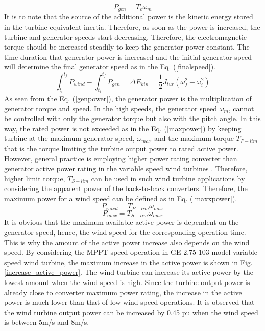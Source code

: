\begin{equation}
P_{gen}=T_{e} \omega_{m}
\label{genpower}
\end{equation}
It is to note that the source of the additional power is the kinetic energy stored in the turbine equivalent inertia. Therefore, as soon as the power is increased, the turbine and generator speeds start decreasing. Therefore, the electromagnetic torque should be increased steadily to keep the generator power constant. The time duration that generator power is increased and the initial generator speed will determine the final generator speed as in the Eq. (\ref{finalspeed}).
\begin{equation}
 \int_{t_{i}}^{t_{f}}P_{wind}- \int_{t_{i}}^{t_{f}}P_{gen}=\Delta E_{kin}=\frac{1}{2}J_{tur}(\omega_{f}^2-\omega_{i}^2)
\label{finalspeed}
\end{equation}
As seen from the Eq. (\ref{genpower}), the generator power is the multiplication of generator torque and speed. In the high speeds, the generator speed $\omega_{m}$, cannot be controlled with only the generator torque but also with the pitch angle. In this way, the rated power is not exceeded as in the Eq. (\ref{maxpower}) by keeping turbine at the maximum generator speed, $\omega_{max}$ and the maximum torque $T_{P-lim}$ that is the torque limiting the turbine output power to rated active power. However, general practice is employing higher power rating converter than generator active power rating in the variable speed wind turbines \cite{Muljadi2012}.  Therefore, higher limit torque, $T_{S-lim}$ can be used in such wind turbine applications by considering the apparent power of the back-to-back converters. Therefore, the maximum power for a wind speed can be defined as in Eq. (\ref{maxxpower}).
\begin{equation}
P_{rated}=T_{P-lim} \omega_{max}
\label{maxpower}
\end{equation}
\begin{equation}
P_{max}=T_{S-lim} \omega_{max}
\label{maxxpower}
\end{equation}
It is obvious that the maximum available active power is dependent on the generator speed, hence, the wind speed for the corresponding operation time. This is why the amount of the active power increase also depends on the wind speed. By considering the MPPT speed operation in GE 2.75-103 model variable speed wind turbine, the maximum increase in the active power is shown in Fig. \ref{increase_active_power}. The wind turbine can increase its active power by the lowest amount when the wind speed is high. Since the turbine output power is already close to converter maximum power rating, the increase in the active power is much lower than that of low wind speed operations. It is observed that the wind turbine output power can be increased by 0.45 pu when the wind speed is between 5m/s and 8m/s. \par
